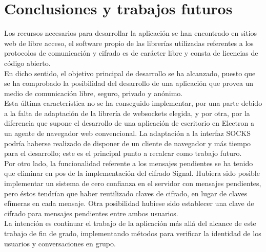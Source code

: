 \chapter{Conclusiones y trabajos futuros} \label{chap:conclusiones}

Los recursos necesarios para desarrollar la aplicación se han encontrado en sitios web de libre acceso, el software propio de las librerías utilizadas referentes a los protocolos de comunicación y cifrado es de carácter libre y consta de licencias de código abierto. \\

En dicho sentido, el objetivo principal de desarrollo se ha alcanzado, puesto que se ha comprobado la posibilidad del desarrollo de una aplicación que provea un medio de comunicación libre, seguro, privado y anónimo. \\ 

Esta última característica no se ha conseguido implementar, por una parte debido a la falta de adaptación de la librería de websockets elegida, y por otra, por la diferencia que supone el desarrollo de una aplicación de escritorio en Electron a un agente de navegador web convencional. La adaptación a la interfaz SOCKS podría haberse realizado de disponer de un cliente de navegador y más tiempo para el desarrollo; este es el principal punto a recalcar como trabajo futuro. \\

Por otro lado, la funcionalidad referente a los mensajes pendientes se ha tenido que eliminar en pos de la implementación del cifrado Signal. Hubiera sido posible implementar un sistema de cero confianza en el servidor con mensajes pendientes, pero éstos tendrían que haber reutilizado claves de cifrado, en lugar de claves efímeras en cada mensaje. Otra posibilidad hubiese sido establecer una clave de cifrado para mensajes pendientes entre ambos usuarios. \\

La intención es continuar el trabajo de la aplicación más allá del alcance de este trabajo de fin de grado, implementando métodos para verificar la identidad de los usuarios y conversaciones en grupo. \\